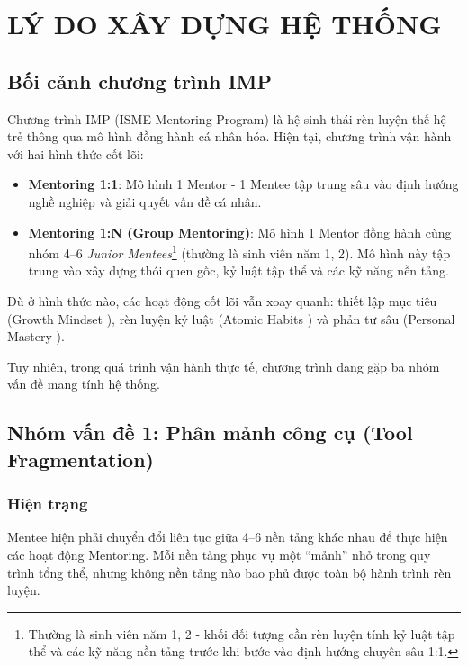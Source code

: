 \chapter{LÝ DO XÂY DỰNG HỆ THỐNG}

\section{Bối cảnh chương trình IMP}
Chương trình IMP (ISME Mentoring Program) là hệ sinh thái rèn luyện thế hệ trẻ thông qua mô hình đồng hành cá nhân hóa. Hiện tại, chương trình vận hành với hai hình thức cốt lõi:

\begin{itemize}
  \item \textbf{Mentoring 1:1}: Mô hình 1 Mentor - 1 Mentee tập trung sâu vào định hướng nghề nghiệp và giải quyết vấn đề cá nhân.
  \item \textbf{Mentoring 1:N (Group Mentoring)}: Mô hình 1 Mentor đồng hành cùng nhóm 4--6 \textit{Junior Mentees}\footnote{Thường là sinh viên năm 1, 2 - khối đối tượng cần rèn luyện tính kỷ luật tập thể và các kỹ năng nền tảng trước khi bước vào định hướng chuyên sâu 1:1.} (thường là sinh viên năm 1, 2). Mô hình này tập trung vào xây dựng thói quen gốc, kỷ luật tập thể và các kỹ năng nền tảng.
\end{itemize}

Dù ở hình thức nào, các hoạt động cốt lõi vẫn xoay quanh: thiết lập mục tiêu (Growth Mindset \citep{dweck2006}), rèn luyện kỷ luật (Atomic Habits \citep{atomichabits2018}) và phản tư sâu (Personal Mastery \citep{senge2006}).

Tuy nhiên, trong quá trình vận hành thực tế, chương trình đang gặp ba nhóm vấn đề mang tính hệ thống.

\section{Nhóm vấn đề 1: Phân mảnh công cụ (Tool Fragmentation)}

\subsection{Hiện trạng}
Mentee hiện phải chuyển đổi liên tục giữa 4--6 nền tảng khác nhau để thực hiện các hoạt động Mentoring. Mỗi nền tảng phục vụ một ``mảnh'' nhỏ trong quy trình tổng thể, nhưng không nền tảng nào bao phủ được toàn bộ hành trình rèn luyện.

